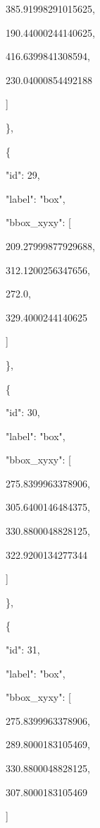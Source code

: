 \documentclass[10pt,a4paper]{article}
\begin{document}
        385.91998291015625,\allowbreak{}\par
        190.44000244140625,\allowbreak{}\par
        416.6399841308594,\allowbreak{}\par
        230.04000854492188\par
      ]\par
    \},\allowbreak{}\par
    \{\par
      "id":\allowbreak{} 29,\allowbreak{}\par
      "label":\allowbreak{} "box",\allowbreak{}\par
      "bbox\_xyxy":\allowbreak{} [\par
        209.27999877929688,\allowbreak{}\par
        312.1200256347656,\allowbreak{}\par
        272.0,\allowbreak{}\par
        329.4000244140625\par
      ]\par
    \},\allowbreak{}\par
    \{\par
      "id":\allowbreak{} 30,\allowbreak{}\par
      "label":\allowbreak{} "box",\allowbreak{}\par
      "bbox\_xyxy":\allowbreak{} [\par
        275.8399963378906,\allowbreak{}\par
        305.6400146484375,\allowbreak{}\par
        330.8800048828125,\allowbreak{}\par
        322.9200134277344\par
      ]\par
    \},\allowbreak{}\par
    \{\par
      "id":\allowbreak{} 31,\allowbreak{}\par
      "label":\allowbreak{} "box",\allowbreak{}\par
      "bbox\_xyxy":\allowbreak{} [\par
        275.8399963378906,\allowbreak{}\par
        289.8000183105469,\allowbreak{}\par
        330.8800048828125,\allowbreak{}\par
        307.8000183105469\par
      ]\par
\end{document}
